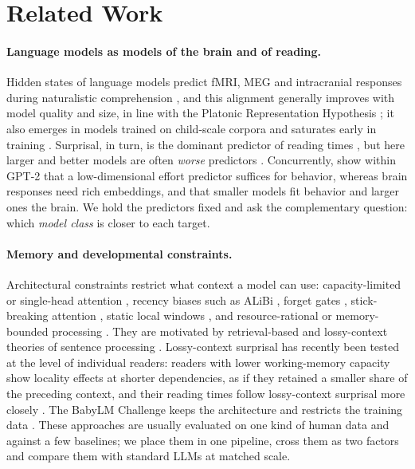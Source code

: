 \section{Related Work}
\label{sec:related}

\paragraph{Language models as models of the brain and of reading.}
Hidden states of language models predict fMRI, MEG and intracranial responses during naturalistic comprehension \citep{schrimpf2021neural,caucheteux2022brains,caucheteux2023evidence,toneva2019interpreting}, and this alignment generally improves with model quality and size, in line with the Platonic Representation Hypothesis \citep{huh2024platonic}; it also emerges in models trained on child-scale corpora \citep{hosseini2024artificial} and saturates early in training \citep{alkhamissi-etal-2025-language}. Surprisal, in turn, is the dominant predictor of reading times \citep{hale2001probabilistic,levy2008expectation,smithlevy2013effect,wilcox2023testing,shain2024large}, but here larger and better models are often \emph{worse} predictors \citep{ohschuler2023why,ohschuler2023twobillion,kuribayashi2021lower,wilcox2024bigger}. Concurrently, \citet{devarda2026behavioral} show within GPT-2 that a low-dimensional effort predictor suffices for behavior, whereas brain responses need rich embeddings, and that smaller models fit behavior and larger ones the brain. We hold the predictors fixed and ask the complementary question: which \emph{model class} is closer to each target.

\paragraph{Memory and developmental constraints.}
Architectural constraints restrict what context a model can use: capacity-limited or single-head attention \citep{timkey2023limited}, recency biases such as ALiBi \citep{press2021train,devarda2024locally,clark2025linear,thamma2025humanlike}, forget gates \citep{lin2025forgetting}, stick-breaking attention \citep{tan2025scaling}, static local windows \citep{bu2026staticlinearattentionconstraints}, and resource-rational or memory-bounded processing \citep{hahn2022resourcerational,xu2026memory,xufutrell2026strategic,keshev2025working}. They are motivated by retrieval-based and lossy-context theories of sentence processing \citep{lewisvasishth2005activation,futrell2020lossy,gibson2000dlt}. Lossy-context surprisal has recently been tested at the level of individual readers: readers with lower working-memory capacity show locality effects at shorter dependencies, as if they retained a smaller share of the preceding context, and their reading times follow lossy-context surprisal more closely \citep{li2027modeling}. The BabyLM Challenge keeps the architecture and restricts the training data \citep{warstadt2023cfp,warstadt2023findings,hu2024secondbabylm,huebner2021babyberta}. These approaches are usually evaluated on one kind of human data and against a few baselines; we place them in one pipeline, cross them as two factors and compare them with standard LLMs at matched scale.

